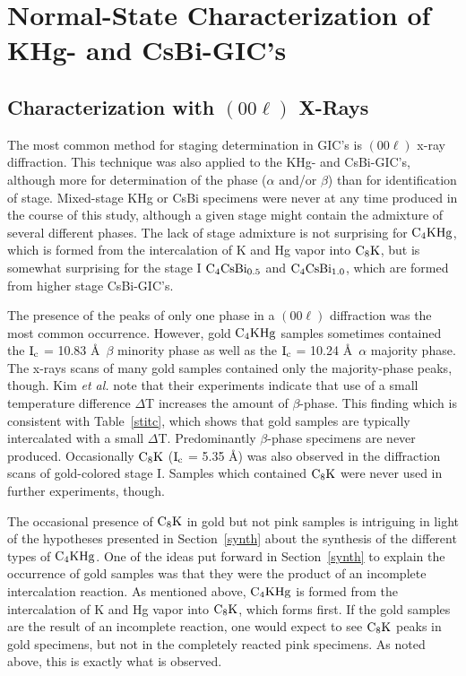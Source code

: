 \section{Normal-State Char\-ac\-ter\-iza\-tion of KHg- and CsBi-GIC's}
\label{charac}

\subsection{Characterization with $(00\ell)$ X-Rays}
\label{xrd}

        The  most common  method  for staging   determination  in GIC's  is
$(00\ell)$ x-ray diffraction.\cite{I94} This technique  was also applied to
the KHg- and   CsBi-GIC's,  although  more for determination of   the phase
($\alpha$ and/or  $\beta$)  than for identification  of stage.  Mixed-stage
KHg or CsBi specimens were never at any time produced in the course of this
study, although a  given  stage  might  contain the admixture  of   several
different phases.  The lack of stage admixture is  not  surprising for $\rm
C_4KHg$, which is formed from the intercalation of K and Hg vapor into $\rm
C_8K$,\cite{A157,elmakrini80} but is somewhat surprising for  the stage I
$\rm C_4CsBi_{0.5}$ and  $\rm C_4CsBi_{1.0}$,  which are formed from higher
stage CsBi-GIC's.\cite{bendriss86b}

        The  presence of   the  peaks of   only one phase  in  a $(00\ell)$
diffraction  was the most  common  occurrence.   However, gold $\rm C_4KHg$
samples sometimes  contained  the $\rm I_c$  = 10.83 \AA\  $\beta$ minority
phase as well as the $\rm  I_c$ = 10.24  \AA\ $\alpha$ majority phase.  The
x-rays scans of many gold samples contained  only the majority-phase peaks,
though.  Kim {\em  et al.\/} note  that their experiments indicate that use
of  a   small  temperature  difference  $\Delta$T  increases the  amount of
$\beta$-phase.  This  finding  which is consistent  with Table~\ref{stitc},
which  shows that  gold samples   are typically intercalated   with a small
$\Delta$T.      Predominantly    $\beta$-phase       specimens    are never
produced.\cite{lagrange83} Occasionally $\rm C_8K$  ($\rm I_c$ =  5.35 \AA)
was also observed  in   the diffraction scans   of  gold-colored   stage I.
Samples which contained $\rm C_8K$ were never  used in further experiments,
though.

        The occasional presence of $\rm C_8K$  in gold but not pink samples
is intriguing in light of the  hypotheses presented  in Section~\ref{synth}
about  the synthesis of the different  types of $\rm  C_4KHg$.   One of the
ideas put forward in Section~\ref{synth}  to explain the occurrence of gold
samples  was that  they  were  the product of  an  incomplete intercalation
reaction.   As   mentioned  above,  $\rm   C_4KHg$   is   formed   from the
intercalation of  K   and Hg   vapor  into  $\rm     C_8K$,  which    forms
first.\cite{timp83,elmakrini80} If the gold  samples are the  result  of an
incomplete reaction,  one would expect  to see   $\rm C_8K$ peaks   in gold
specimens, but not in the completely reacted pink specimens.  As noted above,
this is exactly what is observed.

